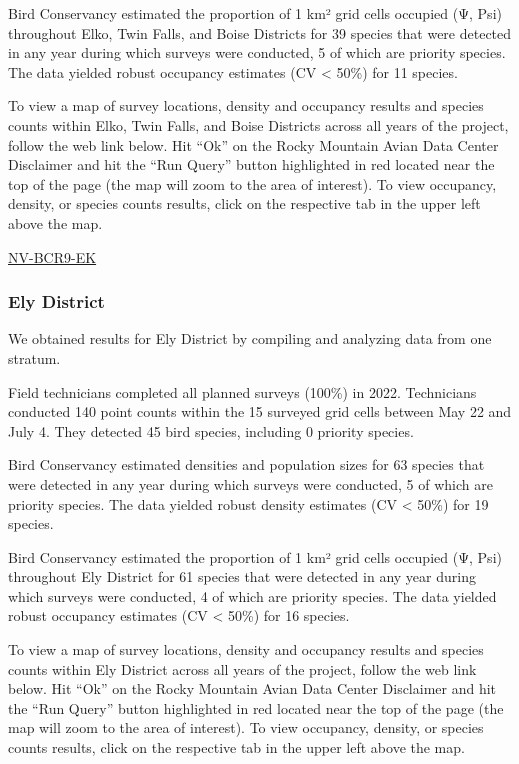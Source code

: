 \documentclass[
  letterpaper,
  DIV=11,
  numbers=noendperiod,
  oneside]{scrreprt}
\begin{document}
Bird Conservancy estimated the proportion of 1 km² grid cells occupied
(Ψ, Psi) throughout Elko, Twin Falls, and Boise Districts for 39 species
that were detected in any year during which surveys were conducted, 5 of
which are priority species. The data yielded robust occupancy estimates
(CV \textless{} 50\%) for 11 species.

To view a map of survey locations, density and occupancy results and
species counts within Elko, Twin Falls, and Boise Districts across all
years of the project, follow the web link below. Hit ``Ok'' on the Rocky
Mountain Avian Data Center Disclaimer and hit the ``Run Query'' button
highlighted in red located near the top of the page (the map will zoom
to the area of interest). To view occupancy, density, or species counts
results, click on the respective tab in the upper left above the map.

\href{http://www.rmbo.org/new_site/adc/QueryWindow.aspx\#N4IgzgLgTghhCuBbEAuABCAcgNQLQCEBhAJQE5cBRAaXX3igFMZ40B7AMzQBkYA7AEzQBZPjADmDRA14Q0uNBQA2Aa1YAaNABUA7gEteaAGIxFisBr6D8rXWAZoAIrei6AxhDAgAvkA=}{NV-BCR9-EK}

\hypertarget{ely-district}{%
\subsubsection{Ely District}\label{ely-district}}

We obtained results for Ely District by compiling and analyzing data
from one stratum.

Field technicians completed all planned surveys (100\%) in 2022.
Technicians conducted 140 point counts within the 15 surveyed grid cells
between May 22 and July 4. They detected 45 bird species, including 0
priority species.

Bird Conservancy estimated densities and population sizes for 63 species
that were detected in any year during which surveys were conducted, 5 of
which are priority species. The data yielded robust density estimates
(CV \textless{} 50\%) for 19 species.

Bird Conservancy estimated the proportion of 1 km² grid cells occupied
(Ψ, Psi) throughout Ely District for 61 species that were detected in
any year during which surveys were conducted, 4 of which are priority
species. The data yielded robust occupancy estimates (CV \textless{}
50\%) for 16 species.

To view a map of survey locations, density and occupancy results and
species counts within Ely District across all years of the project,
follow the web link below. Hit ``Ok'' on the Rocky Mountain Avian Data
Center Disclaimer and hit the ``Run Query'' button highlighted in red
located near the top of the page (the map will zoom to the area of
interest). To view occupancy, density, or species counts results, click
on the respective tab in the upper left above the map.
\end{document}
